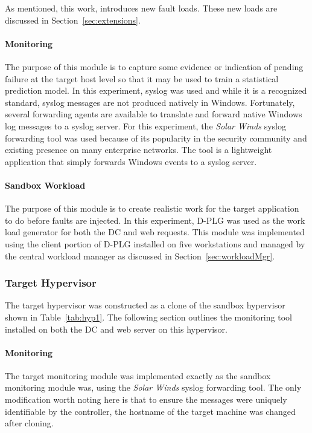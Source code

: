As mentioned, this work, introduces new fault loads.  These new loads are
discussed in Section~\ref{sec:extensions}.

\paragraph{Monitoring} \label{sec:sandboxMonitoringTool} 
The purpose of this module is to capture some evidence or indication of pending
failure at the target host level so that it may be used to train a statistical
prediction model.  In this experiment, syslog was used and while it is a
recognized standard, syslog messages are not produced natively in Windows.
Fortunately, several forwarding agents are available to translate and forward
native Windows log messages to a syslog server.  For this experiment, the
\emph{Solar Winds} syslog forwarding tool was used because of its popularity in
the security community and existing presence on many enterprise networks.  The
tool is a lightweight application that simply forwards Windows events to a
syslog server.

\paragraph{Sandbox Workload}  \label{sec:sandboxWorkload} 
The purpose of this module is to create realistic work for the target
application to do before faults are injected.  In this experiment, \ac{D-PLG}
was used as the work load generator for both the \ac{DC} and web requests.
This module was implemented using the client portion of \ac{D-PLG} installed on
five workstations and managed by the central workload manager as discussed in
Section~\ref{sec:workloadMgr}.

\subsubsection{Target Hypervisor} \label{sec:target}
The target hypervisor was constructed as a clone of the sandbox hypervisor
shown in Table~\ref{tab:hyp1}.  The following section outlines the monitoring
tool installed on both the \ac{DC} and web server on this hypervisor.

\paragraph{Monitoring} \label{sec:targetMonitoringTool}
The target monitoring module was implemented exactly as the sandbox monitoring
module was, using the \emph{Solar Winds} syslog forwarding tool.  The only
modification worth noting here is that to ensure the messages were uniquely
identifiable by the controller, the hostname of the target machine was changed
after cloning.

